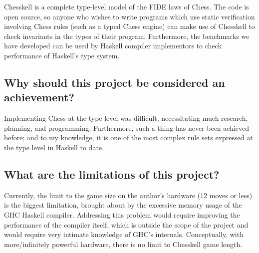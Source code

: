 Chesskell is a complete type-level model of the FIDE laws of Chess. The code is open source, so anyone who wishes to write programs which use static verification involving Chess rules (such as a typed Chess engine) can make use of Chesskell to check invariants in the types of their program. Furthermore, the benchmarks we have developed can be used by Haskell compiler implementors to check performance of Haskell's type system.

\subsection{Why should this project be considered an achievement?}

Implementing Chess at the type level was difficult, necessitating much research, planning, and programming. Furthermore, such a thing has never been achieved before; and to my knowledge, it is one of the most complex rule sets expressed at the type level in Haskell to date.


\subsection{What are the limitations of this project?}

Currently, the limit to the game size on the author's hardware (12 moves or less) is the biggest limitation, brought about by the excessive memory usage of the GHC Haskell compiler. Addressing this problem would require improving the performance of the compiler itself, which is outside the scope of the project and would require very intimate knowledge of GHC's internals. Conceptually, with more/infinitely powerful hardware, there is no limit to Chesskell game length.
